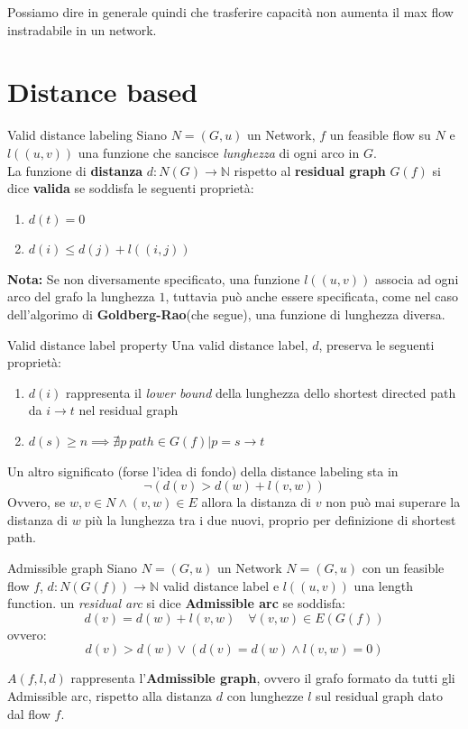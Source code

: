\documentclass[a4paper, 11pt]{report}
\begin{document}
Possiamo dire in generale quindi che trasferire capacità non aumenta il max flow instradabile in un network.

\newpage
\section{Distance based}
\begin{definition}[label = VDL]{Valid distance labeling}{}
    Siano $N = (G,u)$ un Network, $f$ un feasible flow su $N$ e $l((u,v))$ una funzione che sancisce \textit{lunghezza} di ogni arco in $G$.\\
    La funzione di \textbf{distanza} $d: N(G) \rightarrow \mathbb{N}$ rispetto al \textbf{residual graph}
    $G(f)$  si dice \textbf{valida} se soddisfa le seguenti proprietà:
    \begin{enumerate}
        \item $d(t) = 0$
        \item $d(i) \le d(j) + l((i,j))$
    \end{enumerate}
\end{definition}
\textbf{Nota:} Se non diversamente specificato, una funzione $l((u,v))$ associa ad ogni arco del grafo la lunghezza $1$,
 tuttavia può anche essere specificata, come nel caso dell'algorimo di \textbf{Goldberg-Rao}(che segue),
una funzione di lunghezza diversa. 
\begin{obs}{Valid distance label property}{}
    Una valid distance label, $d$, preserva le seguenti proprietà:
    \begin{enumerate}
        \item $d(i)$ rappresenta il \textit{lower bound} della lunghezza dello shortest directed path da $i \rightarrow t$
        nel residual graph
        \item $d(s) \ge n \implies \nexists p\ path \in G(f) | p = s \rightarrow t $ %
    \end{enumerate}
    
\end{obs}
Un altro significato (forse l'idea di fondo) della distance labeling sta in \[\neg (d(v) > d(w) + l(v,w))\]
Ovvero, se $w,v \in N \land (v,w) \in E$ allora la distanza di $v$ non può mai superare la distanza di $w$ più la lunghezza tra i due nuovi, 
proprio per definizione di shortest path.

\begin{definition}[label = AdmissibleGraph]{Admissible graph}{}
    Siano $N = (G,u)$ un Network $N = (G,u)$ con un feasible flow $f$, $d: N(G(f)) \rightarrow \mathbb{N}$ valid distance label 
    e $l((u,v))$ una length function.
    un \textit{residual arc} si dice \textbf{Admissible arc} se soddisfa:
    \[d(v) = d(w) + l(v,w) \quad \forall (v,w) \in E(G(f))\]
    ovvero:
    \[d(v) > d(w) \lor (d(v) = d(w) \land l(v,w) = 0)\]
    
    $A(f,l,d)$ rappresenta l'\textbf{Admissible graph}, ovvero il grafo formato da tutti gli Admissible arc, rispetto alla distanza $d$ con lunghezze $l$ 
    sul residual graph dato dal flow $f$.
\end{definition}
\end{document}
